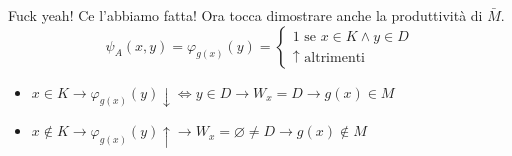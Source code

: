 \documentclass[a4paper,oneside]{scrbook}
\begin{document}
Fuck yeah! Ce l'abbiamo fatta! Ora tocca dimostrare anche la produttività di $\bar{M}$.
\begin{equation*}
	\psi_A(x,y)=
	\varphi_{g(x)}(y)=
	\begin{cases}
		1 \text{ se } x \in K \wedge y \in D\\
		\uparrow \text{ altrimenti}
	\end{cases}
\end{equation*}
\begin{itemize}
	\item $x\in K \rightarrow \varphi_{g(x)}(y)\downarrow \iff y\in D \rightarrow W_x=D \rightarrow g(x)\in M$
	\item $x\notin K \rightarrow \varphi_{g(x)}(y)\uparrow \rightarrow W_x=\varnothing \ne D \rightarrow g(x)\notin M$
\end{itemize}
\end{document}
